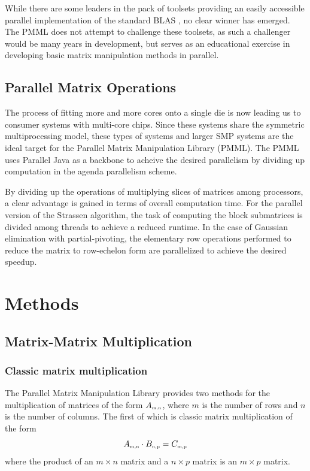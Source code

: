 \documentclass{dependencies/acm_proc_article-sp}
\begin{document}
While there are some leaders in the pack of toolsets providing an easily accessible parallel implementation of the standard BLAS \cite{SCALAPACK,PLAPACK}, no clear winner has emerged. The PMML does not attempt to challenge these toolsets, as such a challenger would be many years in development, but serves as an educational exercise in developing basic matrix manipulation methods in parallel. 

\subsection{Parallel Matrix Operations}

The process of fitting more and more cores onto a single die is now leading us to consumer systems with multi-core chips. Since these systems share the symmetric multiprocessing model, these types of systems and larger SMP systems are the ideal target for the Parallel Matrix Manipulation Library (PMML). The PMML uses Parallel Java as a backbone to acheive the desired parallelism by dividing up computation in the agenda parallelism scheme.

By dividing up the operations of multiplying slices of matrices among processors, a clear advantage is gained in terms of overall computation time. For the parallel version of the Strassen algorithm, the task of computing the block submatrices is divided among threads to achieve a reduced runtime. In the case of Gaussian elimination with partial-pivoting, the elementary row operations performed to reduce the matrix to row-echelon form are parallelized to achieve the desired speedup.

\section{Methods}



\subsection{Matrix-Matrix Multiplication}

\subsubsection{Classic matrix multiplication}
The Parallel Matrix Manipulation Library provides two methods for the multiplication of matrices of the form $A_{\mbox{\tiny m,n}}$, where $m$ is the number of rows and $n$ is the number of columns. The first of which is classic matrix multiplication of the form
\begin{equation}
\label{AB=C}
A_{\mbox{\tiny m,n}}\cdot B_{\mbox{\tiny n,p}} = C_{\mbox{\tiny m,p}}
\end{equation}
where the product of an $m\times n$ matrix and a $n\times p$ matrix is an $m\times p$ matrix.
\end{document}
